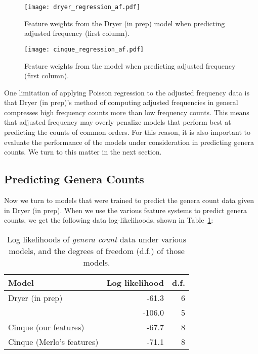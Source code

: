 \documentclass[11pt]{article}
\begin{document}
\begin{figure}[ht!]
  \centering
  \texttt{[image: dryer\_regression\_af.pdf]}
  \caption{Feature weights from the Dryer (in prep) model when predicting adjusted frequency (first column).}
  \label{fig:dryer-model}
\end{figure}

\begin{figure}[ht!]
  \centering
  \texttt{[image: cinque\_regression\_af.pdf]}
  \cprotect\caption{Feature weights from the \citet{cinque2005deriving} model when predicting adjusted frequency (first column).}
  \label{fig:cinque-model}
\end{figure}

One limitation of applying Poisson regression to the adjusted
frequency data is that Dryer (in prep)'s method of computing adjusted
frequencies in general compresses high frequency counts more than low
frequency counts.  This means that adjusted frequency may overly penalize
models that perform best at predicting the counts of common orders.
For this reason, it is also important to evaluate the performance of the models under
consideration in predicting genera counts.  We turn to this matter in
the next section.

\subsection{Predicting Genera Counts}

Now we turn to models that were trained to predict the genera count data given in Dryer (in prep).
When we use the various feature systems to predict genera counts, we get the following data log-likelihoods, shown in Table~\ref{tab:genera-likelihoods}:

\begin{table}
  \centering
  \begin{tabular}{|l|r|r|}
    \hline
    Model & Log likelihood & d.f. \\
    \hline
    Dryer (in prep) & -61.3 & 6 \\
    \citet{cysouw2010dealing} & -106.0 & 5 \\
    Cinque (our features) & -67.7 & 8 \\
    Cinque (Merlo's features) & -71.1 & 8 \\
    \hline 
  \end{tabular}
  \caption{Log likelihoods of \emph{genera count} data under various models, and the degrees of freedom (d.f.) of those models.}  
  \label{tab:genera-likelihoods}
\end{table}
\end{document}
